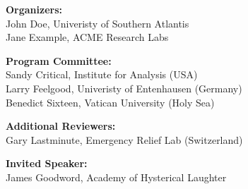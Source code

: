 \documentclass[11pt]{article}
\begin{document}

\vspace*{0.5cm}


\begin{description}
\item{\bf Organizers:}\vspace{2mm} \\
John Doe, Univeristy of Southern Atlantis\\
Jane Example, ACME Research Labs

\vspace{3mm}
\item{\bf Program Committee:}\vspace{2mm} \\
Sandy Critical, Institute for Analysis (USA)\\
Larry Feelgood, Univeristy of Entenhausen (Germany)\\
Benedict Sixteen, Vatican University (Holy Sea)

\vspace{3mm}
\item{\bf Additional Reviewers:} \vspace{2mm} \\
Gary Lastminute, Emergency Relief Lab (Switzerland)

\vspace{3mm}
\item{\bf Invited Speaker:}\vspace{2mm} \\
James Goodword, Academy of Hysterical Laughter



\end{description}
\end{document}
